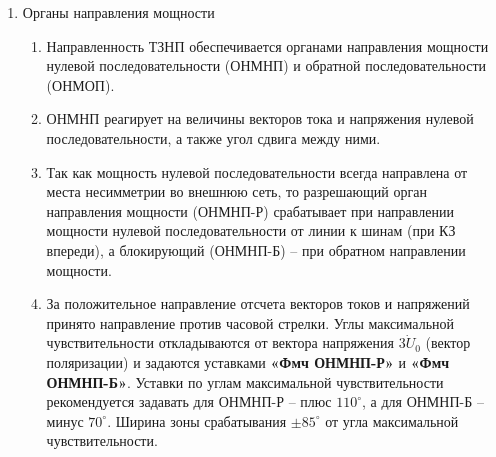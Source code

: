 \begin{enumerate}
\begin{enumerate}
\item
ТЗНП может быть оперативно выведена из работы от внешнего сигнала \textit{«ТЗНП: Вывод»}, назначенного на соответствующий дискретный вход или функциональную клавишу. Выводятся все ступени ТЗНП, а также все виды ускорения ТЗНП.

\item
Предусмотрена блокировка чувствительных ступеней ТЗНП, который производится от внешнего сигнала \textit{«Логика БЧС: Блок. ЧС ТЗНП»}, поданного на соответствующий вход ФСУ. Программными ключами \textbf{«Блок ТЗНП-N по чувств.»} можно задать ступени, выводимые из работы.


\end{enumerate}

\item Органы направления мощности
\begin{enumerate}

\item
Направленность ТЗНП обеспечивается органами направления мощности нулевой последовательности (ОНМНП) и обратной последовательности (ОНМОП). 

\item
ОНМНП реагирует на величины векторов тока и напряжения нулевой последовательности, а также угол сдвига между ними. 

\item
Так как мощность нулевой последовательности всегда направлена от места несимметрии во внешнюю сеть, то разрешающий орган направления мощности (ОНМНП-Р) срабатывает при направлении мощности нулевой последовательности от линии к шинам (при КЗ впереди), а блокирующий (ОНМНП-Б) – при обратном направлении мощности. 

\item
За положительное направление отсчета векторов токов и напряжений принято направление против часовой стрелки. Углы максимальной чувствительности откладываются от вектора напряжения $\dot {3U_0}$ (вектор поляризации) и задаются уставками \textbf{«Фмч ОНМНП-Р»} и \textbf{«Фмч ОНМНП-Б»}. Уставки по углам максимальной чувствительности рекомендуется задавать для ОНМНП-Р – плюс $110^\circ$, а для ОНМНП-Б – минус $70^\circ$. Ширина зоны срабатывания $\pm 85^\circ$ от угла максимальной чувствительности.


\end{enumerate}
\end{enumerate}
